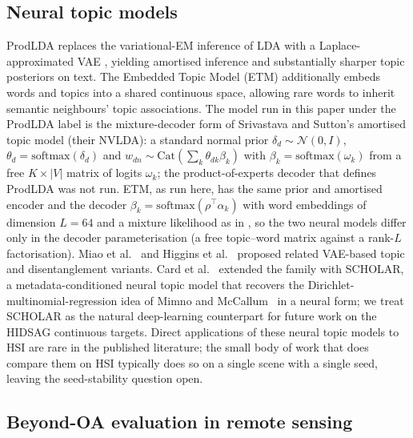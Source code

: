 \documentclass[journal,a4paper,10pt]{IEEEtran}
\begin{document}
\subsection{Neural topic models}

ProdLDA \cite{srivastava2017autoencoding} replaces the
variational-EM inference of LDA with a Laplace-approximated VAE
\cite{kingma2014auto}, yielding amortised inference and substantially
sharper topic posteriors on text. The Embedded Topic Model (ETM)
\cite{dieng2020topic} additionally embeds words and topics into a
shared continuous space, allowing rare words to inherit semantic
neighbours' topic associations. The model run in this paper under the
ProdLDA label is the mixture-decoder form of Srivastava and Sutton's
amortised topic model (their NVLDA): a standard normal prior
$\delta_d \sim \mathcal{N}(0, I)$, $\theta_d = \mathrm{softmax}(\delta_d)$
and $w_{dn} \sim \mathrm{Cat}(\sum_k \theta_{dk} \beta_k)$ with
$\beta_k = \mathrm{softmax}(\omega_k)$ from a free $K \times |V|$ matrix
of logits $\omega_k$; the product-of-experts decoder that defines ProdLDA was not
run. ETM, as run here, has the same prior and amortised encoder and
the decoder $\beta_k = \mathrm{softmax}(\rho^{\top}\alpha_k)$ with word
embeddings of dimension $L = 64$ and a mixture likelihood as in
\cite{dieng2020topic}, so the two neural models differ only in the
decoder parameterisation (a free topic--word matrix against a rank-$L$
factorisation). Miao et al.\ \cite{miao2016neural} and
Higgins et al.\ \cite{higgins2017betavae} proposed related VAE-based
topic and disentanglement variants. Card et
al.\ \cite{card2018scholar} extended the family with SCHOLAR, a
metadata-conditioned neural topic model that recovers the
Dirichlet-multinomial-regression idea of Mimno and
McCallum~\cite{mimno2008topic} in a neural form; we treat SCHOLAR as
the natural deep-learning counterpart for future work on the HIDSAG
continuous targets. Direct
applications of these neural topic models to HSI are rare in the
published literature; the small body of work that does compare them
on HSI typically does so on a single scene with a single seed,
leaving the seed-stability question open.

\subsection{Beyond-OA evaluation in remote sensing}
\end{document}
